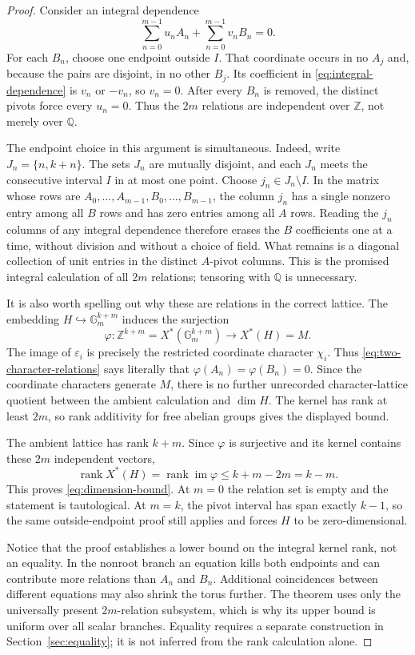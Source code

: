 \documentclass[11pt]{article}
\theoremstyle{definition}
\theoremstyle{remark}
\newcommand{\Gm}{\mathbb{G}_{m}}
\newcommand{\Z}{\mathbb{Z}}
\newcommand{\Q}{\mathbb{Q}}
\newcommand{\rank}{\operatorname{rank}}
\begin{document}
\begin{proof}
Consider an integral dependence
\begin{equation}
\sum_{n=0}^{m-1}u_nA_n+\sum_{n=0}^{m-1}v_nB_n=0.
\label{eq:integral-dependence}
\end{equation}
For each $B_n$, choose one endpoint outside $I$.  That coordinate occurs in no $A_j$ and, because the pairs are disjoint, in no other $B_j$.  Its coefficient in \eqref{eq:integral-dependence} is $v_n$ or $-v_n$, so $v_n=0$.  After every $B_n$ is removed, the distinct pivots force every $u_n=0$.  Thus the $2m$ relations are independent over $\Z$, not merely over $\Q$.

The endpoint choice in this argument is simultaneous.  Indeed, write
$J_n=\{n,k+n\}$.  The sets $J_n$ are mutually disjoint, and each $J_n$
meets the consecutive interval $I$ in at most one point.  Choose
$j_n\in J_n\setminus I$.  In the matrix whose rows are
$A_0,\ldots,A_{m-1},B_0,\ldots,B_{m-1}$, the column $j_n$ has a single
nonzero entry among all $B$ rows and has zero entries among all $A$ rows.
Reading the $j_n$ columns of any integral dependence therefore erases the
$B$ coefficients one at a time, without division and without a choice of
field.  What remains is a diagonal collection of unit entries in the
distinct $A$-pivot columns.  This is the promised integral calculation of
all $2m$ relations; tensoring with $\Q$ is unnecessary.

It is also worth spelling out why these are relations in the correct
lattice.  The embedding $H\hookrightarrow\Gm^{k+m}$ induces the surjection
\[
\varphi:\Z^{k+m}=X^*(\Gm^{k+m})\longrightarrow X^*(H)=M.
\]
The image of $\varepsilon_i$ is precisely the restricted coordinate
character $\chi_i$.  Thus \eqref{eq:two-character-relations} says literally
that $\varphi(A_n)=\varphi(B_n)=0$.  Since the coordinate characters generate
$M$, there is no further unrecorded character-lattice quotient between the
ambient calculation and $\dim H$.  The kernel has rank at least $2m$, so
rank additivity for free abelian groups gives the displayed bound.

The ambient lattice has rank $k+m$.  Since $\varphi$ is surjective and its kernel contains these $2m$ independent vectors,
\[
\rank X^*(H)=\rank\operatorname{im}\varphi
 \leq k+m-2m=k-m.
\]
This proves \eqref{eq:dimension-bound}.  At $m=0$ the relation set is empty and the statement is tautological.  At $m=k$, the pivot interval has span exactly $k-1$, so the same outside-endpoint proof still applies and forces $H$ to be zero-dimensional.

Notice that the proof establishes a lower bound on the integral kernel rank,
not an equality.  In the nonroot branch an equation kills both endpoints and
can contribute more relations than $A_n$ and $B_n$.  Additional coincidences
between different equations may also shrink the torus further.  The theorem
uses only the universally present $2m$-relation subsystem, which is why its
upper bound is uniform over all scalar branches.  Equality requires a
separate construction in Section~\ref{sec:equality}; it is not inferred from
the rank calculation alone.


\end{proof}
\end{document}
